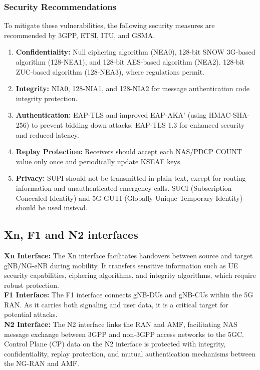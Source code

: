 \documentclass{report}
\begin{document}
\subsubsection{Security Recommendations}
To mitigate these vulnerabilities, the following security measures are recommended by 3GPP, ETSI, ITU, and GSMA. \cite{mahyoub2024security}
\begin{enumerate}
    \item \textbf{Confidentiality:} Null ciphering algorithm (NEA0), 128-bit SNOW 3G-based algorithm (128-NEA1), and 128-bit AES-based algorithm (NEA2). 128-bit ZUC-based algorithm (128-NEA3), where regulations permit.
    \item \textbf{Integrity:} NIA0, 128-NIA1, and 128-NIA2 for message authentication code integrity protection.
    \item \textbf{Authentication: }EAP-TLS and improved EAP-AKA’ (using HMAC-SHA-256) to prevent bidding down attacks. EAP-TLS 1.3 for enhanced security and reduced latency.
    \item \textbf{Replay Protection:} Receivers should accept each NAS/PDCP COUNT value only once and periodically update KSEAF keys.
    \item \textbf{Privacy:} SUPI should not be transmitted in plain text, except for routing information and unauthenticated emergency calls. SUCI (Subscription Concealed Identity) and 5G-GUTI (Globally Unique Temporary Identity) should be used instead.
\end{enumerate}

\subsection{Xn, F1 and N2 interfaces}
\textbf{Xn Interface:} The Xn interface facilitates handovers between source and target gNB/NG-eNB during mobility. It transfers sensitive information such as UE security capabilities, ciphering algorithms, and integrity algorithms, which require robust protection\cite{mahyoub2024security}.\\

\noindent \textbf{F1 Interface: }The F1 interface connects gNB-DUs and gNB-CUs within the 5G RAN. As it carries both signaling and user data, it is a critical target for potential attacks\cite{mahyoub2024security}.\\

\noindent \textbf{N2 Interface: } The N2 interface links the RAN and AMF, facilitating NAS message exchange between 3GPP and non-3GPP access networks to the 5GC. Control Plane (CP) data on the N2 interface is protected with integrity, confidentiality, replay protection, and mutual authentication mechanisms between the NG-RAN and AMF.
\end{document}
